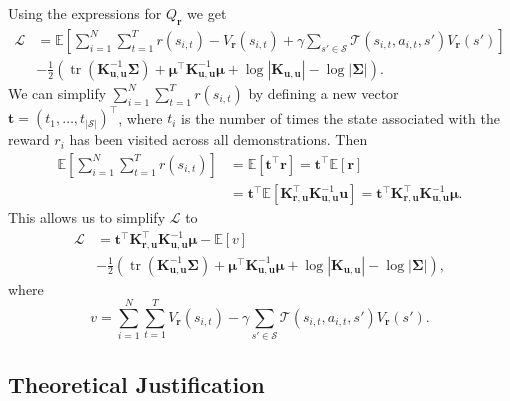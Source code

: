 \documentclass{mpaper}
\DeclareMathOperator{\tr}{tr}
\newcommand{\V}{V_{\mathbf{r}}}
\newcommand{\Kuu}{\mathbf{K}_{\mathbf{u},\mathbf{u}}}
\newcommand{\Kru}{\mathbf{K}_{\mathbf{r},\mathbf{u}}}
\begin{document}
Using the expressions for $Q_{\mathbf{r}}$ we get
\begin{align*}
  \mathcal{L} &= \mathbb{E}\left[\sum_{i=1}^N \sum_{t=1}^T r(s_{i,t}) - \V(s_{i,t}) + \gamma\sum_{s' \in \mathcal{S}} \mathcal{T}(s_{i,t}, a_{i,t}, s')\V(s') \right] \\
              &- \frac{1}{2} \left(\tr \left( \Kuu^{-1}\bm\Sigma \right) + \bm\mu^\intercal\Kuu^{-1}\bm\mu + \log |\Kuu| - \log |\bm\Sigma| \right).
\end{align*}
We can simplify $\sum_{i=1}^N\sum_{t=1}^Tr(s_{i,t})$ by defining a new vector
$\mathbf{t} = (t_1, \dots, t_{|\mathcal{S}|})^\intercal$, where $t_i$ is the
number of times the state associated with the reward $r_i$ has been visited
across all demonstrations. Then
\begin{align*}
  \mathbb{E} \left[ \sum_{i=1}^N\sum_{t=1}^Tr(s_{i,t}) \right] &= \mathbb{E}[\mathbf{t}^\intercal\mathbf{r}] = \mathbf{t}^\intercal\mathbb{E}[\mathbf{r}] \\
                                                               &= \mathbf{t}^\intercal\mathbb{E}\left[\Kru^\intercal\Kuu^{-1}\mathbf{u}\right] = \mathbf{t}^\intercal\Kru^\intercal\Kuu^{-1}\bm\mu.
\end{align*}
This allows us to simplify $\mathcal{L}$ to
\begin{align*}
  \mathcal{L} &= \mathbf{t}^\intercal\Kru^\intercal\Kuu^{-1}\bm\mu - \mathbb{E}[v] \\
              &- \frac{1}{2} \left(\tr \left( \Kuu^{-1}\bm\Sigma \right) + \bm\mu^\intercal\Kuu^{-1}\bm\mu + \log |\Kuu| - \log |\bm\Sigma| \right),
\end{align*}
where
\[
  v = \sum_{i=1}^N \sum_{t=1}^T \V(s_{i,t}) - \gamma\sum_{s' \in \mathcal{S}}
  \mathcal{T}(s_{i,t}, a_{i,t}, s')\V(s').
\]

\subsection{Theoretical Justification}
\end{document}
